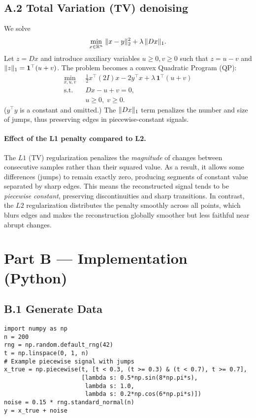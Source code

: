 \documentclass[11pt,a4paper]{article}
\DeclarePairedDelimiter{\norm}{\lVert}{\rVert}
\newcommand{\R}{\mathbb{R}}
\begin{document}
\subsection*{A.2 Total Variation (TV) denoising}
We solve
\begin{equation}
\min_{x\in\R^n} \; \norm{x-y}_2^2 + \lambda\,\norm{Dx}_1.
\end{equation}
Let \(z = Dx\) and introduce auxiliary variables \(u\ge 0, v\ge 0\) such that \(z = u - v\) and \(\norm{z}_1 = \mathbf{1}^\top(u+v)\). The problem becomes a convex Quadratic Program (QP):
\begin{align}
\min_{x,u,v} \; & \; \tfrac{1}{2} x^\top (2I) x - 2 y^\top x + \lambda\, \mathbf{1}^\top(u+v) \\
\text{s.t.}\; & \; Dx - u + v = 0, \\
& \; u \ge 0,\; v \ge 0.
\end{align}
(\(y^\top y\) is a constant and omitted.) The \(\norm{Dx}_1\) term penalizes the number and size of jumps, thus preserving edges in piecewise-constant signals.

\paragraph{Effect of the L1 penalty compared to L2.}
The $L1$ (TV) regularization penalizes the \emph{magnitude} of changes between consecutive samples
rather than their squared value. As a result, it allows some differences (jumps) to remain exactly zero,
producing segments of constant value separated by sharp edges.
This means the reconstructed signal tends to be \emph{piecewise constant}, preserving discontinuities
and sharp transitions. In contrast, the $L2$ regularization distributes the penalty smoothly across
all points, which blurs edges and makes the reconstruction globally smoother but less faithful near
abrupt changes.

\section*{Part B — Implementation (Python)}
\subsection*{B.1 Generate Data}
\begin{lstlisting}[style=mypython,caption={Data generation}]
import numpy as np
n = 200
rng = np.random.default_rng(42)
t = np.linspace(0, 1, n)
# Example piecewise signal with jumps
x_true = np.piecewise(t, [t < 0.3, (t >= 0.3) & (t < 0.7), t >= 0.7],
                      [lambda s: 0.5*np.sin(8*np.pi*s),
                       lambda s: 1.0,
                       lambda s: 0.2*np.cos(6*np.pi*s)])
noise = 0.15 * rng.standard_normal(n)
y = x_true + noise
\end{lstlisting}
\pagebreak
\end{document}
